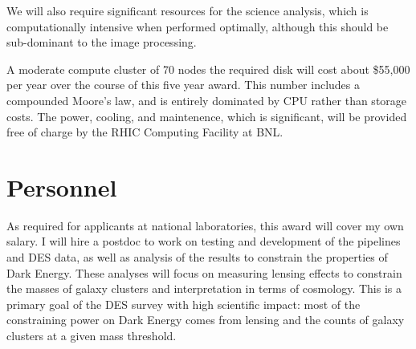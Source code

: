 \documentclass[12pt]{article}
\begin{document}
We will also require significant resources for the science analysis, which is
computationally intensive when performed optimally, although this should be
sub-dominant to the image processing.

A moderate compute cluster of 70 nodes the required disk will cost about
\$55,000 per year over the course of this five year award.  This number
includes a compounded Moore's law, and is entirely dominated by CPU rather than
storage costs.  The power, cooling, and maintenence, which is significant, will
be provided free of charge by the RHIC Computing Facility at BNL.

\section{Personnel}

As required for applicants at national laboratories, this award will cover my
own salary.  I will hire a postdoc to work on testing and development of the
pipelines and DES data, as well as analysis of the results to constrain the
properties of Dark Energy.  These analyses will focus on measuring lensing
effects to constrain the masses of galaxy clusters and interpretation in terms
of cosmology.  This is a primary goal of the DES survey with high scientific
impact:  most of the constraining power on Dark Energy comes from lensing and
the counts of galaxy clusters at a given mass threshold.  
\end{document}
